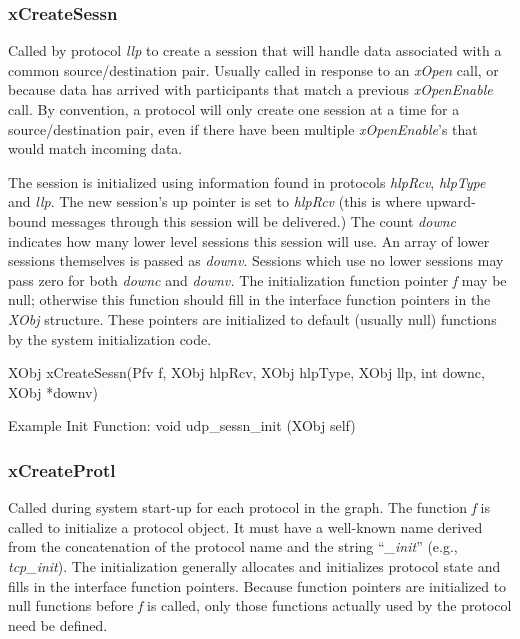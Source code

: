 \subsubsection{xCreateSessn}\label{xCreateSessn}

Called by protocol {\em llp} to create a session that will handle data
associated with a common source/destination pair. Usually called in
response to an {\em xOpen} call, or because data has arrived with
participants that match a previous {\em xOpenEnable} call.  By
convention, a protocol will only create one session at a time for a
source/destination pair, even if there have been multiple {\em
xOpenEnable}'s that would match incoming data.

The session is initialized using information found in protocols {\em hlpRcv},
{\em hlpType} and {\em llp}.  The new session's up pointer is set to
{\em hlpRcv} (this is where upward-bound messages through this session
will be delivered.)
The count {\em downc} indicates how many lower level
sessions this session will use.  An array of lower sessions
themselves is passed as {\em downv}.  Sessions which use no
lower sessions may pass zero for both {\em downc} and {\em
downv.}  
The initialization
function pointer {\em f} may be null; otherwise this function should
fill in the interface function pointers in the {\em XObj} structure.
These pointers are initialized to default (usually null) functions by
the system initialization code.  
\medskip

{\sem XObj} {\bold xCreateSessn}({\sem Pfv} {\caps  f}, 
{\sem XObj} {\caps  hlpRcv}, {\sem XObj} {\caps  hlpType}, 
{\sem XObj} {\caps llp}, {\sem int} {\caps downc}, 
{\sem XObj} *{\caps downv})
\medskip

{\sanss Example Init Function:} {\sem void} {\bold udp\_sessn\_init} ({\sem XObj} {\caps self})

\medskip

\subsubsection{xCreateProtl}

Called during system start-up for each protocol in the graph.  The
function {\em f} is called to initialize a protocol object. It must
have a well-known name derived from the concatenation of the protocol
name and the string ``{\em \_init}'' (e.g., {\em tcp\_init}).  The
initialization generally allocates and initializes protocol state and
fills in the interface function pointers.  Because function pointers
are initialized to null functions before {\em f} is called, only those
functions actually used by the protocol need be defined.

